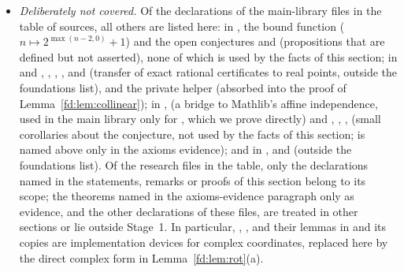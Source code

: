 {\begin{itemize}
   and .
\item \emph{Deliberately not covered.} Of the declarations of the main-library files in the table of
  sources, all others are listed here: in , the bound function
   ($n\mapsto2^{\max(n-2,0)}+1$) and the open conjectures
   and  (propositions that are defined but not
  asserted), none of which is used by the facts of this section; in 
  and , , ,
  ,  and
   (transfer of exact rational certificates to real points, outside the
  foundations list), and the private helper  (absorbed into the proof of
  Lemma~\ref{fd:lem:collinear}); in ,
   (a bridge to Mathlib's affine independence, used in the
  main library only for , which we prove directly) and
  , , ,
   (small corollaries about the conjecture, not used by the facts
  of this section;  is named above only in the axioms evidence); and in
  ,  and
   (outside the foundations list). Of the research files
  in the table, only the declarations named in the statements, remarks or proofs of this section belong to
  its scope; the theorems named in the axioms-evidence paragraph only as evidence, and the other
  declarations of these files, are treated in other sections or lie outside Stage~1. In particular,
  , ,  and their lemmas in  and its copies
  are implementation devices for complex coordinates, replaced here by the direct complex form in
  Lemma~\ref{fd:lem:rot}(a).
\end{itemize}
\par}
